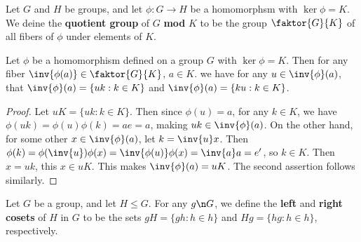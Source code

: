 \begin{definition}
    Let $G$ and  $H$ be groups, and let  $\phi:G \rightarrow H$ be a homomorphsm
    with $\ker{\phi}=K$. We deine the \textbf{quotient group} of $G$
    \textbf{mod} $K$ to be the group $\faktor{G}{K}$ of all fibers of $\phi$
    under elements of $K$.
\end{definition}

\begin{lemma}\label{3.1.3}
    Let $\phi$ be a homomorphism defined on a group  $G$ with  $\ker{\phi}=K$.
    Then for any fiber $\inv{\phi(a)} \in \faktor{G}{K}$, $a \in K$. we have
    for any $u \in \inv{\phi}(a)$, that $\inv{\phi}(a)=\{uk : k \in K\}$ and
    $\inv{\phi}(a)=\{ku : k \in K\}$.
\end{lemma}
\begin{proof}
    Let $uK=\{uk : k \in K\}$. Then since $\phi(u)=a$, for any $k \in K$, we
    have  $\phi(uk)=\phi(u)\phi(k)=ae=a$, making $uk \in \inv {\phi}(a)$. On the
    other hand, for some other $x \in \inv{\phi}(a)$, let $k=\inv{u}x$. Then
     $\phi(k)=\phi(\inv{u})\phi(x)=\inv{\phi(u)}\phi(x)=\inv{a}a=e'$, so $k \in
     K$. Then  $x=uk$, this  $x \in uK$. This makes  $\inv{\phi}(a)=uK$. The
     second assertion follows similarly.
\end{proof}

\begin{definition}
    Let $G$ be a group, and let  $H \leq G$. For any  $g \n G$, we define the
     \textbf{left} and \textbf{right cosets} of $H$ in $G$ to be the sets
     $gH=\{gh : h \in h\}$ and $Hg=\{hg : h \in h\}$, respectively.
\end{definition}
